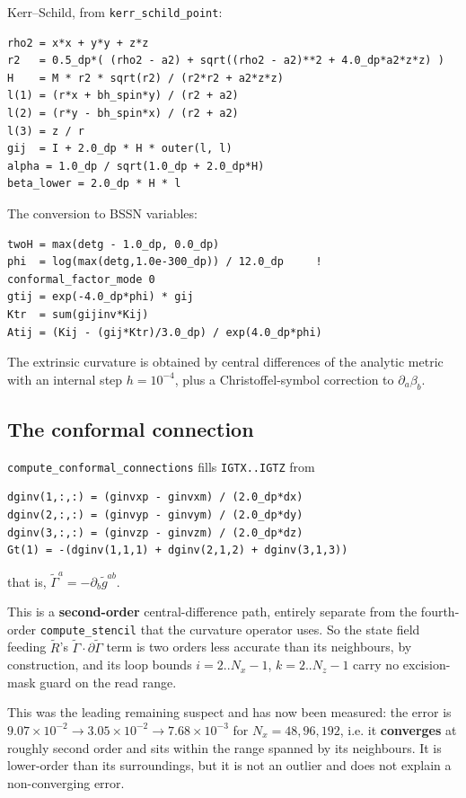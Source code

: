 \documentclass[11pt,openany]{book}
\begin{document}
Kerr--Schild, from \texttt{kerr\_schild\_point}:
\begin{lstlisting}
rho2 = x*x + y*y + z*z
r2   = 0.5_dp*( (rho2 - a2) + sqrt((rho2 - a2)**2 + 4.0_dp*a2*z*z) )
H    = M * r2 * sqrt(r2) / (r2*r2 + a2*z*z)
l(1) = (r*x + bh_spin*y) / (r2 + a2)
l(2) = (r*y - bh_spin*x) / (r2 + a2)
l(3) = z / r
gij  = I + 2.0_dp * H * outer(l, l)
alpha = 1.0_dp / sqrt(1.0_dp + 2.0_dp*H)
beta_lower = 2.0_dp * H * l
\end{lstlisting}

The conversion to BSSN variables:
\begin{lstlisting}
twoH = max(detg - 1.0_dp, 0.0_dp)
phi  = log(max(detg,1.0e-300_dp)) / 12.0_dp     ! conformal_factor_mode 0
gtij = exp(-4.0_dp*phi) * gij
Ktr  = sum(gijinv*Kij)
Atij = (Kij - (gij*Ktr)/3.0_dp) / exp(4.0_dp*phi)
\end{lstlisting}

The extrinsic curvature is obtained by central differences of the analytic
metric with an internal step $h = 10^{-4}$, plus a Christoffel-symbol
correction to $\partial_a\beta_b$.

\subsection{The conformal connection}

\texttt{compute\_conformal\_connections} fills \texttt{IGTX..IGTZ} from
\begin{lstlisting}
dginv(1,:,:) = (ginvxp - ginvxm) / (2.0_dp*dx)
dginv(2,:,:) = (ginvyp - ginvym) / (2.0_dp*dy)
dginv(3,:,:) = (ginvzp - ginvzm) / (2.0_dp*dz)
Gt(1) = -(dginv(1,1,1) + dginv(2,1,2) + dginv(3,1,3))
\end{lstlisting}
that is, $\tilde{\Gamma}^a = -\partial_b \tilde{g}^{ab}$.

\gotcha
This is a \textbf{second-order} central-difference path, entirely separate
from the fourth-order \texttt{compute\_stencil} that the curvature operator
uses. So the state field feeding $\tilde{R}$'s $\tilde{\Gamma}\cdot\partial
\tilde{\Gamma}$ term is two orders less accurate than its neighbours, by
construction, and its loop bounds $i = 2..N_x-1$, $k = 2..N_z-1$ carry no
excision-mask guard on the read range.

This was the leading remaining suspect and has now been measured: the error is
$9.07\times10^{-2} \to 3.05\times10^{-2} \to 7.68\times10^{-3}$ for
$N_x = 48, 96, 192$, i.e. it \textbf{converges} at roughly second order and
sits within the range spanned by its neighbours. It is lower-order than its
surroundings, but it is not an outlier and does not explain a
non-converging error.
\end{document}
